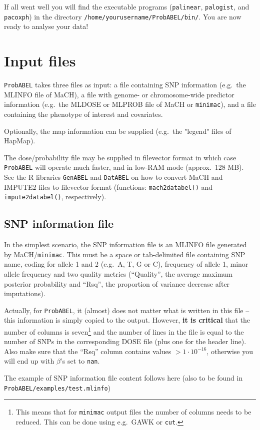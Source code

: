 \documentclass[12pt,a4paper]{article}
\newcommand{\PA}{\texttt{ProbABEL}}
\newcommand{\GA}{\texttt{GenABEL}}
\newcommand{\DA}{\texttt{DatABEL}}
\begin{document}
If all went well you will find the executable programs
(\texttt{palinear}, \texttt{palogist}, and \texttt{pacoxph}) in the
directory \texttt{/home/yourusername/ProbABEL/bin/}. You are now ready
to analyse your data!

\section{Input files}
\PA{} takes three files as input: a file containing SNP
information (e.g.~the MLINFO file of MaCH), a file with genome- or
chromosome-wide predictor information (e.g.~the MLDOSE or MLPROB file
of MaCH or \texttt{minimac}),
and a file containing the phenotype of interest and covariates.

Optionally, the map information can be supplied (e.g.~the "legend"
files of HapMap).

The dose/probability file may be supplied in filevector format
in which case \PA{} will operate much faster, and
in low-RAM mode (approx.~128 MB). See the R libraries \GA{} and
\DA{} on how to convert MaCH and IMPUTE2 files to
filevector format (functions: \texttt{mach2databel()} and
\texttt{impute2databel()}, respectively).

\subsection{SNP information file}
\label{ssec:infoin}
In the simplest scenario, the SNP information file is an MLINFO
file generated by MaCH/\texttt{minimac}. This must be a space or tab-delimited file
containing SNP name, coding for allele 1 and 2 (e.g.~A, T, G or C),
frequency of allele 1, minor allele frequency and two quality
metrics (``Quality'', the average maximum posterior probability and
``Rsq'', the proportion of variance decrease after imputations).

Actually, for \PA{}, it (almost) does not matter what is written in
this file -- this information is simply copied to the output. However,
\textbf{it is critical} that the number of columns is
seven\footnote{This means that for \texttt{minimac} output files the
  number of columns needs to be reduced. This can be done using
  e.g.~GAWK or \texttt{cut}.} and the number of lines in the file is
equal to the number of SNPs in the corresponding DOSE file (plus one
for the header line). Also make sure that the ``Rsq'' column contains
values $>1 \cdot 10^{-16}$, otherwise you will end up with $\beta$'s
set to \texttt{nan}.

The example of SNP information file content follows here (also
to be found in \texttt{ProbABEL/examples/test.mlinfo})
\end{document}
